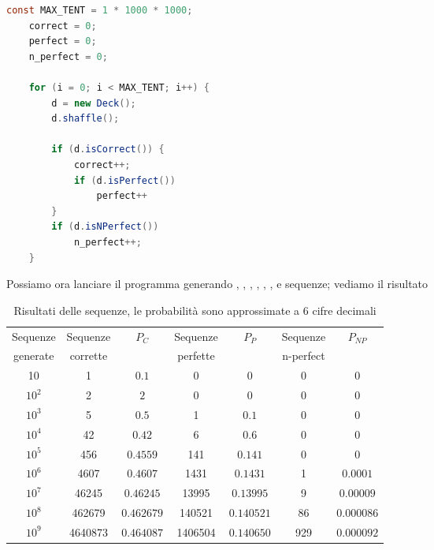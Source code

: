 \documentclass[a4paper]{article}
\begin{document}
\begin{lstlisting}[language=Java]
    const MAX_TENT = 1 * 1000 * 1000;
    correct = 0;
    perfect = 0;
    n_perfect = 0;
    
    for (i = 0; i < MAX_TENT; i++) {
        d = new Deck();
        d.shaffle();
    
        if (d.isCorrect()) {
            correct++;
            if (d.isPerfect()) 
                perfect++
        }
        if (d.isNPerfect())
            n_perfect++;
    }
\end{lstlisting}

\vspace{0.5cm}
\noindent
Possiamo ora lanciare il programma generando , , , , , ,  e  sequenze; vediamo il risultato

\begin{table}[htp]
    \centering
    \begin{tabular}{@{} c c c c c c c @{}}
        \toprule
        Sequenze & Sequenze & $P_C$      & Sequenze & $P_P$      & Sequenze  & $P_{NP}$   \\
        generate & corrette &            & perfette &            & n-perfect &            \\
        \midrule
        10       & 1        & $0.1$      & 0        & $0$        & 0         & $0$        \\
        $10^2$   & 2        & $2$        & 0        & $0$        & 0         & $0$        \\
        $10^3$   & 5        & $0.5$      & 1        & $0.1$      & 0         & $0$        \\
        $10^4$   & 42       & $0.42$     & 6        & $0.6$      & 0         & $0$        \\
        $10^5$   & 456      & $0.4559$   & 141      & $0.141$    & 0         & $0$        \\
        $10^6$   & 4607     & $0.4607$   & 1431     & $0.1431$   & 1         & $0.0001$   \\
        $10^7$   & 46245    & $0.46245$  & 13995    & $0.13995$  & 9         & $0.00009$  \\
        $10^8$   & 462679   & $0.462679$ & 140521   & $0.140521$ & 86        & $0.000086$ \\
        $10^9$   & 4640873  & $0.464087$ & 1406504  & $0.140650$ & 929       & $0.000092$ \\
        \bottomrule
    \end{tabular}
    \caption{Risultati delle sequenze, le probabilità sono approssimate a 6 cifre decimali}
\end{table}
\end{document}
